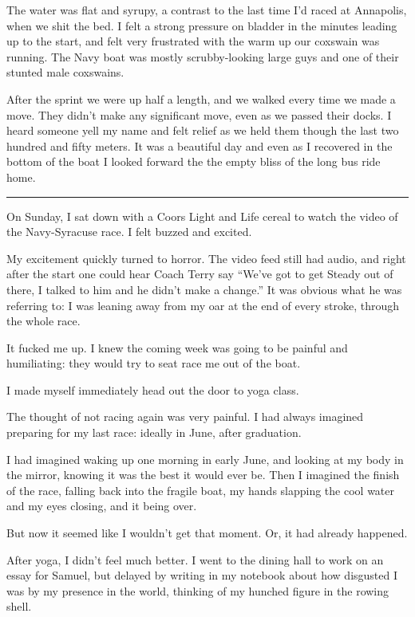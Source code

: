The water was flat and syrupy, a contrast to the last time I'd raced at
Annapolis, when we shit the bed.  I felt a strong pressure on bladder in the
minutes leading up to the start, and felt very frustrated with the warm up our
coxswain was running.  The Navy boat was mostly scrubby-looking large guys and
one of their stunted male coxswains.

After the sprint we were up half a length, and we walked every time we made a
move.  They didn't make any significant move, even as we passed their docks.  I
heard someone yell my name and felt relief as we held them though the last
two hundred and fifty meters.  It was a beautiful day and even as I recovered in
the bottom of the boat I looked forward the the empty bliss of the long bus ride
home.

\plainfancybreak{12pt}{2}{* * *}

On Sunday, I sat down with a Coors Light and Life cereal to watch the video of
the Navy-Syracuse race.  I felt buzzed and excited. 

My excitement quickly turned to horror.  The video feed still had audio, and
right after the start one could hear Coach Terry say ``We've got to get Steady
out of there, I talked to him and he didn't make a change.''  It was obvious
what he was referring to: I was leaning away from my oar at the end of every
stroke, through the whole race.

It fucked me up.  I knew the coming week was going to be painful and
humiliating: they would try to seat race me out of the boat.

I made myself immediately head out the door to yoga class.  

The thought of not racing again was very painful.  I had always imagined
preparing for my last race: ideally in June, after graduation.

I had imagined waking up one morning in early June, and looking at my body in
the mirror, knowing it was the best it would ever be.  Then I imagined  the
finish of the race, falling back into the fragile boat, my hands slapping the
cool water and my eyes closing, and it being over.

But now it seemed like I wouldn't get that moment.  Or, it had already happened.

After yoga, I didn't feel much better.  I went to the dining hall to work on an
essay for Samuel, but delayed by writing in my notebook about how disgusted I
was by my presence in the world, thinking of my hunched figure in the rowing
shell.

